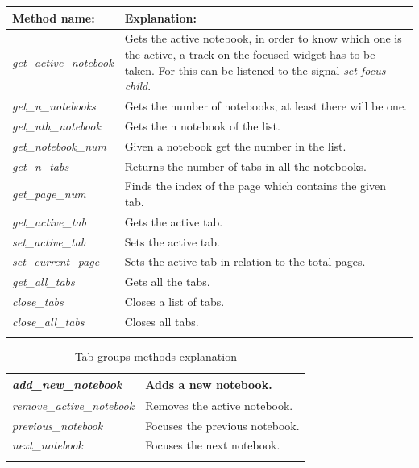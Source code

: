 \begin{table}[H]
  \begin{center}
    \begin{tabularx}{\textwidth}{|l|X|}
      \firsthline
      \textbf{Method name:} & \textbf{Explanation:} \\
      \hline
      \textit{get\_active\_notebook} & Gets the active notebook, in order to know which one is the active, a track on the focused widget has to be taken. For this can be listened to the signal \emph{set-focus-child}. \\
      \hline
      \textit{get\_n\_notebooks} & Gets the number of notebooks, at least there will be one. \\
      \hline
      \textit{get\_nth\_notebook} & Gets the n notebook of the list. \\
      \hline
      \textit{get\_notebook\_num} & Given a notebook get the number in the list. \\
      \hline
      \textit{get\_n\_tabs} & Returns the number of tabs in all the notebooks. \\
      \hline
      \textit{get\_page\_num} & Finds the index of the page which contains the given tab. \\
      \hline
      \textit{get\_active\_tab} & Gets the active tab. \\
      \hline
      \textit{set\_active\_tab} & Sets the active tab. \\
      \textit{set\_current\_page} & Sets the active tab in relation to the total pages. \\
      \hline
      \textit{get\_all\_tabs} & Gets all the tabs. \\
      \hline
      \textit{close\_tabs} & Closes a list of tabs. \\
      \hline
      \textit{close\_all\_tabs} & Closes all tabs. \\
      \lasthline
    \end{tabularx}
  \end{center}
\end{table}

\newpage
\begin{table}[H]
  \begin{center}
    \begin{tabularx}{\textwidth}{|l|X|}
      \firsthline
      \textit{add\_new\_notebook} & Adds a new notebook. \\
      \hline
      \textit{remove\_active\_notebook} & Removes the active notebook. \\
      \hline
      \textit{previous\_notebook} & Focuses the previous notebook. \\
      \hline
      \textit{next\_notebook} & Focuses the next notebook. \\
      \lasthline
    \end{tabularx}
    \caption{Tab groups methods explanation}
  \end{center}
\end{table}

